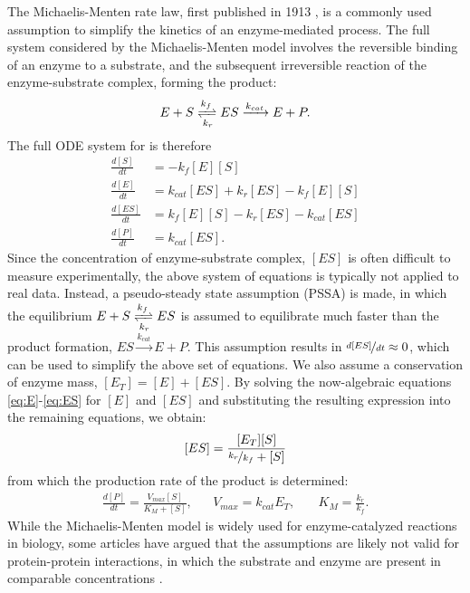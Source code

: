 The Michaelis-Menten rate law, first published in 1913 \cite{Johnson2011}, is a commonly used assumption to simplify the kinetics of an enzyme-mediated process.
The full system considered by the Michaelis-Menten model involves the reversible binding of an enzyme to a substrate, and the subsequent irreversible reaction of the enzyme-substrate complex, forming the product:
\begin{equation}
  E + S \xrightleftharpoons[k_r]{k_f} ES \xrightarrow{k_{cat}} E + P.
  \label{eq:mmreactions}
\end{equation}
The full ODE system for  is therefore
\begin{align}
  \frac{d[S]}{dt} &=  -k_f[E][S] \label{eq:S}\\
  \frac{d[E]}{dt} &= k_{cat}[ES] + k_r[ES] - k_f[E][S] \label{eq:E}\\
  \frac{d[ES]}{dt} &= k_f[E][S] - k_r[ES] - k_{cat}[ES] \label{eq:ES}\\
  \frac{d[P]}{dt} &= k_{cat}[ES]. \label{eq:P}
\end{align}
Since the concentration of enzyme-substrate complex, $[ES]$ is often difficult to measure experimentally, the above system of equations is typically not applied to real data.
Instead, a pseudo-steady state assumption (PSSA) is made, in which the equilibrium $E + S \xrightleftharpoons[k_r]{k_f} ES$ is assumed to equilibrate much faster than the product formation, $ES \xrightarrow{k_{cat}} E + P$.
This assumption results in $\nicefrac{d[ES]}{dt} \approx 0$, which can be used to simplify the above set of equations. 
We also assume a conservation of enzyme mass, $[E_T] = [E] + [ES]$. 
By solving the now-algebraic equations \ref{eq:E}-\ref{eq:ES} for $[E]$ and $[ES]$ and substituting the resulting expression into the remaining equations, we obtain:
\[
  [ES] = \frac{[E_T][S]}{\nicefrac{k_r}{k_f} + [S]}
\]
from which the production rate of the product is determined:
\begin{align*}
  \frac{d[P]}{dt} = \frac{V_{max}[S]}{K_M + [S]}, & & V_{max} = k_{cat}E_T, & \quad K_M = \frac{k_r}{k_f}.
\end{align*}
While the Michaelis-Menten model is widely used for enzyme-catalyzed reactions in biology, some articles have argued that the assumptions are likely not valid for protein-protein interactions, in which the substrate and enzyme are present in comparable concentrations \cite{Tzafriri2004}.

